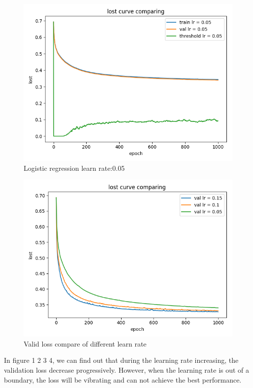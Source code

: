 \documentclass[journal, a4paper]{IEEEtran}
\begin{document}
\begin{figure}[!htb]
	\begin{center}
	\includegraphics[width=\columnwidth]{logr_05}
	\caption{Logistic regression learn rate:0.05}
	\label{fig:logr_05}
	\end{center}
\end{figure}
\begin{figure}[!htb]
	\begin{center}
	\includegraphics[width=\columnwidth]{logr_val_cp}
	\caption{Valid loss compare of different learn rate}
	\label{fig:logr_val_cp}
	\end{center}
\end{figure}

In figure 1 2 3 4, we can find out that during the learning rate increasing, the validation loss decrease progressively. However, when the learning rate is out of a boundary, the loss will be vibrating and can not achieve the best performance.
\end{document}
